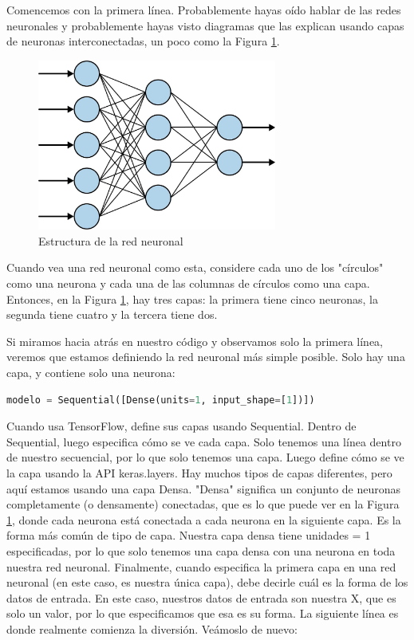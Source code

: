 Comencemos con la primera línea. Probablemente hayas oído hablar de las redes neuronales y probablemente hayas visto diagramas que las explican usando capas de neuronas interconectadas, un poco como la Figura \ref{cap3:005}.


\begin{figure}[htb]
	\centering
	\includegraphics[width=0.7\textwidth]{capitulo3/neurona.jpg}
	\caption{Estructura de la red neuronal}
	\label{cap3:005}
\end{figure}

Cuando vea una red neuronal como esta, considere cada uno de los "círculos" como una neurona y cada una de las columnas de círculos como una capa. Entonces, en la Figura \ref{cap3:005}, hay tres capas: la primera tiene cinco neuronas, la segunda tiene cuatro y la tercera tiene dos.

Si miramos hacia atrás en nuestro código y observamos solo la primera línea, veremos que estamos definiendo la red neuronal más simple posible. Solo hay una capa, y contiene solo una neurona:

\begin{lstlisting}[language=python]
modelo = Sequential([Dense(units=1, input_shape=[1])])
\end{lstlisting}

Cuando usa TensorFlow, define sus capas usando Sequential. Dentro de Sequential, luego especifica cómo se ve cada capa. Solo tenemos una línea dentro de nuestro secuencial, por lo que solo tenemos una capa. Luego define cómo se ve la capa usando la API keras.layers. Hay muchos tipos de capas diferentes, pero aquí estamos usando una capa Densa. "Densa" significa un conjunto de neuronas completamente (o densamente) conectadas, que es lo que puede ver en la Figura \ref{cap3:005}, donde cada neurona está conectada a cada neurona en la siguiente capa. Es la forma más común de tipo de capa. Nuestra capa densa tiene unidades = 1 especificadas, por lo que solo tenemos una capa densa con una neurona en toda nuestra red neuronal. Finalmente, cuando especifica la primera capa en una red neuronal (en este caso, es nuestra única capa), debe decirle cuál es la forma de los datos de entrada. En este caso, nuestros datos de entrada son nuestra X, que es solo un valor, por lo que especificamos que esa es su forma. La siguiente línea es donde realmente comienza la diversión. Veámoslo de nuevo:

